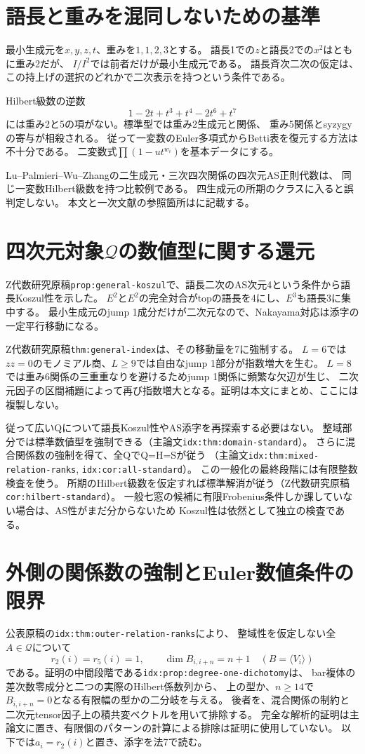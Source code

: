 \documentclass[11pt,a4paper]{ltjsarticle}
\begin{document}
\section{語長と重みを混同しないための基準}
最小生成元を$x,y,z,t$、重みを$1,1,2,3$とする。
語長1での$z$と語長2での$x^2$はともに重み2だが、
$I/I^2$では前者だけが最小生成元である。
語長斉次二次の仮定は、この持上げの選択のどれかで二次表示を持つという条件である。

Hilbert級数の逆数
\[
1-2t+t^3+t^4-2t^6+t^7
\]
には重み2と5の項がない。標準型では重み2生成元と関係、
重み5関係とsyzygyの寄与が相殺される。
従って一変数のEuler多項式からBetti表を復元する方法は不十分である。
二変数式$\prod(1-ut^{w_i})$を基本データにする。

Lu--Palmieri--Wu--Zhangの二生成元・三次四次関係の四次元AS正則代数は、
同じ一変数Hilbert級数を持つ比較例である。
四生成元の所期のクラスに入ると誤判定しない。
本文と一次文献の参照箇所はに記載する。

\section{四次元対象\texorpdfstring{$\mathcal Q$}{Q}の数値型に関する還元}
Z代数研究原稿\texttt{prop:general-koszul}で、語長二次のAS次元4という条件から語長Koszul性を示した。
$E^2$と$E^2$の完全対合がtopの語長を4にし、$E^3$も語長3に集中する。
最小生成元のjump 1成分だけが二次元なので、Nakayama対応は添字の一定平行移動になる。

Z代数研究原稿\texttt{thm:general-index}は、その移動量を7に強制する。
$L=6$では$zz=0$のモノミアル商、$L\geq9$では自由なjump 1部分が指数増大を生む。
$L=8$では重み6関係の三重重なりを避けるためjump 1関係に頻繁な欠辺が生じ、
二次元因子の区間補題によって再び指数増大となる。証明は本文にまとめ、ここには複製しない。

従って広いQについて語長Koszul性やAS添字を再探索する必要はない。
整域部分では標準数値型を強制できる（主論文\texttt{idx:thm:domain-standard}）。
さらに混合関係数の強制を得て、全QでQ=H=Sが従う
（主論文\texttt{idx:thm:mixed-relation-ranks}, \texttt{idx:cor:all-standard}）。
この一般化の最終段階には有限整数検査を使う。
所期のHilbert級数を仮定すれば標準解消が従う（Z代数研究原稿\texttt{cor:hilbert-standard}）。
一般七窓の候補に有限Frobenius条件しか課していない場合は、AS性がまだ分からないため
Koszul性は依然として独立の検査である。

\section{外側の関係数の強制とEuler数値条件の限界}
公表原稿の\texttt{idx:thm:outer-relation-ranks}により、
整域性を仮定しない全$A\in\mathcal Q$について
\[
r_2(i)=r_5(i)=1,\qquad
\dim B_{i,i+n}=n+1\quad(B=\langle V_i\rangle)
\]
である。証明の中間段階である\texttt{idx:prop:degree-one-dichotomy}は、
bar複体の差次数零成分と二つの実際のHilbert係数列から、
上の型か、$n\geq14$で$B_{i,i+n}=0$となる有限幅の型かの二分岐を与える。
後者を、混合関係の制約と二次元tensor因子上の積共変ベクトルを用いて排除する。
完全な解析的証明は主論文に置き、有限個のパターンの計算による排除は証明に使用していない。
以下では$a_i=r_2(i)$と置き、添字を法7で読む。
\end{document}
